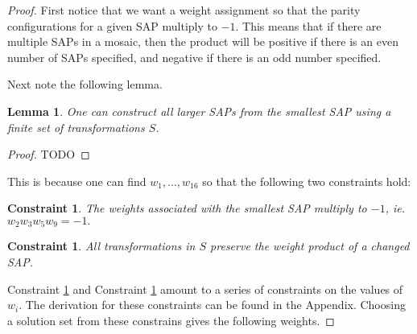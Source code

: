 \documentclass[12pt]{article}
\theoremstyle{plain}
\newtheorem{lemma}[thm]{Lemma}
\newtheorem{constraint}[thm]{Constraint}
\theoremstyle{definition}
\theoremstyle{remark}
\theoremstyle{definition}
\begin{document}
\begin{proof}
First notice that we want a weight assignment so that the parity configurations for a given SAP multiply to $-1$. This means that if there are multiple SAPs in a mosaic, then the product will be positive if there is an even number of SAPs specified, and negative if there is an odd number specified.

Next note the following lemma.
\begin{lemma}
    \label{lemma: build bigger saps}
    One can construct all larger SAPs from the smallest SAP using a finite set of transformations $S$.
\end{lemma}

\begin{proof}
    TODO
\end{proof}

This is because one can find $w_{1} , \dots, w_{16}$ so that the following two constraints hold:

\begin{constraint}
    \label{constraint: smallest sap prod}
    The weights associated with the smallest SAP multiply to $-1$, ie. $w_2 w_3 w_5 w_9 = -1.$ 
\end{constraint}

\begin{constraint}
    \label{constraint: prod works}
    \emph{All} transformations in $S$ preserve the weight product of a changed SAP.
\end{constraint}

Constraint \ref{constraint: smallest sap prod} and Constraint \ref{constraint: prod works} amount to a series of constraints on the values of $w_i$. The derivation for these constraints can be found in the Appendix. Choosing a solution set from these constrains gives the following weights.


\end{proof}
\end{document}
